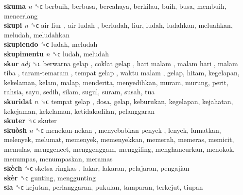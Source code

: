 \textbf{skuma} \emph{n}  ␝ϲ  berbuih, berbusa, bercahaya, berkilau, buih, busa, membuih, mencerlang  \\
\textbf{skupi} \emph{n}  ␝ϲ   air liur ,  air ludah , berludah, liur, ludah, ludahkan, meluahkan, meludah, meludahkan  \\
\textbf{skupiendo} ␝ϲ  ludah, meludah  \\
\textbf{skupimentu} \emph{n}  ␝ϲ  ludah, meludah  \\
\textbf{skur} \emph{adj}  ␝ϲ   berwarna gelap ,  coklat gelap ,  hari malam ,  malam hari ,  malam tiba ,  taram-temaram ,  tempat gelap ,  waktu malam , gelap, hitam, kegelapan, kekelaman, kelam, malap, menderita, menyedihkan, muram, murung, perit, rahsia, sayu, sedih, silam, sugul, suram, susah, tua  \\
\textbf{skuridat} \emph{n}  ␝ϲ   tempat gelap , dosa, gelap, keburukan, kegelapan, kejahatan, kekejaman, kekelaman, ketidakadilan, pelanggaran  \\
\textbf{skuter} ␝ϲ  skuter  \\
\textbf{skuòsh} \emph{n}  ␝ϲ   menekan-nekan ,  menyebabkan penyek , lenyek, lumatkan, melenyek, melumat, memenyek, memenyekkan, memerah, memeras, memicit, memulas, menggencet, menggenggam, menggiling, menghancurkan, menokok, menumpas, menumpaskan, meramas  \\
\textbf{skèch} ␝ϲ   sketsa ringkas , lakar, lakaran, pelajaran, pengajian  \\
\textbf{skèr} ␝ϲ  gunting, menggunting  \\
\textbf{sla} ␝ϲ  kejutan, perlanggaran, pukulan, tamparan, terkejut, tiupan  \\

